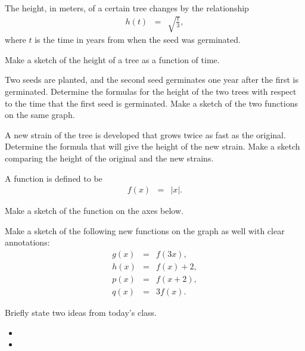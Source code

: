 \begin{problem}
\item The height, in meters, of a certain tree changes by the
  relationship
  \begin{eqnarray*}
    h(t) & = & \sqrt{\frac{t}{3}},
  \end{eqnarray*}
  where $t$ is the time in years from when the seed was germinated. 
  \begin{subproblem}
  \item Make a sketch of the height of a tree as a function of time.
    \vfill
  \item Two seeds are planted, and the second seed germinates one year
    after the first is germinated. Determine the formulas for the
    height of the two trees with respect to the time that the first
    seed is germinated. Make a sketch of the two functions on the same
    graph.
    \vfill
  \item A new strain of the tree is developed that grows twice as fast
    as the original. Determine the formula that will give the height
    of the new strain. Make a sketch comparing the height of the
    original and the new strains.
    \vfill
  \end{subproblem}

  \clearpage

\item A function is defined to be
  \begin{eqnarray*}
    f(x) & = & |x|.
  \end{eqnarray*}
  \begin{subproblem}
  \item Make a sketch of the function on the axes below.
  \item Make a sketch of the following new functions on the graph as
    well with clear annotations:
    \begin{eqnarray*}
      g(x) & = & f(3x), \\
      h(x) & = & f(x)+2, \\
      p(x) & = & f(x+2), \\
      q(x) & = & 3f(x).
    \end{eqnarray*}

    \scalebox{0.95}{}

  \end{subproblem}
\end{problem}

\postClass

\begin{problem}
\item Briefly state two ideas from today's class.
  \begin{itemize}
  \item 
  \item 
  \end{itemize}
\item 
  \begin{subproblem}
    \item
  \end{subproblem}
\end{problem}



